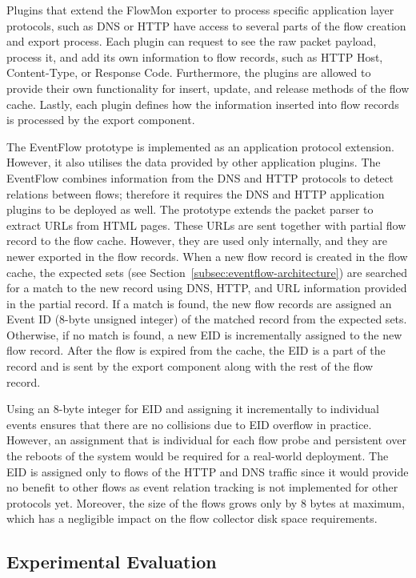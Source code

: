 Plugins that extend the FlowMon exporter to process specific application layer protocols, such as DNS or HTTP have access to several parts of the flow creation and export process. Each plugin can request to see the raw packet payload, process it, and add its own information to flow records, such as HTTP Host, Content-Type, or Response Code. Furthermore, the plugins are allowed to provide their own functionality for insert, update, and release methods of the flow cache. Lastly, each plugin defines how the information inserted into flow records is processed by the export component.

The EventFlow prototype is implemented as an application protocol extension. However, it also utilises the data provided by other application plugins. The EventFlow combines information from the DNS and HTTP protocols to detect relations between flows; therefore it requires the DNS and HTTP application plugins to be deployed as well. The prototype extends the packet parser to extract URLs from HTML pages. These URLs are sent together with partial flow record to the flow cache. However, they are used only internally, and they are newer exported in the flow records. When a new flow record is created in the flow cache, the expected sets (see Section~\ref{subsec:eventflow-architecture}) are searched for a match to the new record using DNS, HTTP, and URL information provided in the partial record. If a match is found, the new flow records are assigned an Event ID (8-byte unsigned integer) of the matched record from the expected sets. Otherwise, if no match is found, a new EID is incrementally assigned to the new flow record. After the flow is expired from the cache, the EID is a part of the record and is sent by the export component along with the rest of the flow record.

Using an 8-byte integer for EID and assigning it incrementally to individual events ensures that there are no collisions due to EID overflow in practice. However, an assignment that is individual for each flow probe and persistent over the reboots of the system would be required for a real-world deployment. The EID is assigned only to flows of the HTTP and DNS traffic since it would provide no benefit to other flows as event relation tracking is not implemented for other protocols yet. Moreover, the size of the flows grows only by 8 bytes at maximum, which has a negligible impact on the flow collector disk space requirements.


\subsection{Experimental Evaluation} \label{subsec:eventflow-evaluation}

